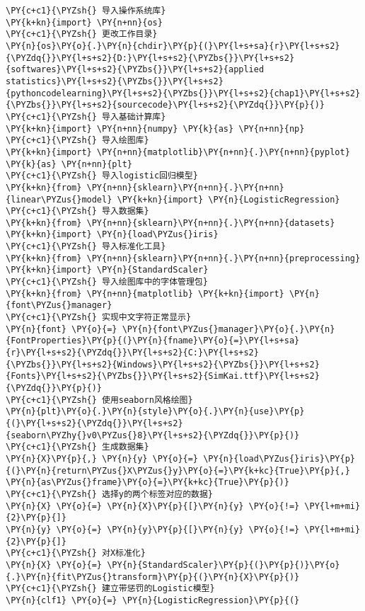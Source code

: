 \begin{Verbatim}[commandchars=\\\{\}]
\PY{c+c1}{\PYZsh{} 导入操作系统库}
\PY{k+kn}{import} \PY{n+nn}{os}
\PY{c+c1}{\PYZsh{} 更改工作目录}
\PY{n}{os}\PY{o}{.}\PY{n}{chdir}\PY{p}{(}\PY{l+s+sa}{r}\PY{l+s+s2}{\PYZdq{}}\PY{l+s+s2}{D:}\PY{l+s+s2}{\PYZbs{}}\PY{l+s+s2}{softwares}\PY{l+s+s2}{\PYZbs{}}\PY{l+s+s2}{applied statistics}\PY{l+s+s2}{\PYZbs{}}\PY{l+s+s2}{pythoncodelearning}\PY{l+s+s2}{\PYZbs{}}\PY{l+s+s2}{chap1}\PY{l+s+s2}{\PYZbs{}}\PY{l+s+s2}{sourcecode}\PY{l+s+s2}{\PYZdq{}}\PY{p}{)}
\PY{c+c1}{\PYZsh{} 导入基础计算库}
\PY{k+kn}{import} \PY{n+nn}{numpy} \PY{k}{as} \PY{n+nn}{np}
\PY{c+c1}{\PYZsh{} 导入绘图库}
\PY{k+kn}{import} \PY{n+nn}{matplotlib}\PY{n+nn}{.}\PY{n+nn}{pyplot} \PY{k}{as} \PY{n+nn}{plt}
\PY{c+c1}{\PYZsh{} 导入logistic回归模型}
\PY{k+kn}{from} \PY{n+nn}{sklearn}\PY{n+nn}{.}\PY{n+nn}{linear\PYZus{}model} \PY{k+kn}{import} \PY{n}{LogisticRegression}
\PY{c+c1}{\PYZsh{} 导入数据集}
\PY{k+kn}{from} \PY{n+nn}{sklearn}\PY{n+nn}{.}\PY{n+nn}{datasets} \PY{k+kn}{import} \PY{n}{load\PYZus{}iris}
\PY{c+c1}{\PYZsh{} 导入标准化工具}
\PY{k+kn}{from} \PY{n+nn}{sklearn}\PY{n+nn}{.}\PY{n+nn}{preprocessing} \PY{k+kn}{import} \PY{n}{StandardScaler}
\PY{c+c1}{\PYZsh{} 导入绘图库中的字体管理包}
\PY{k+kn}{from} \PY{n+nn}{matplotlib} \PY{k+kn}{import} \PY{n}{font\PYZus{}manager}
\PY{c+c1}{\PYZsh{} 实现中文字符正常显示}
\PY{n}{font} \PY{o}{=} \PY{n}{font\PYZus{}manager}\PY{o}{.}\PY{n}{FontProperties}\PY{p}{(}\PY{n}{fname}\PY{o}{=}\PY{l+s+sa}{r}\PY{l+s+s2}{\PYZdq{}}\PY{l+s+s2}{C:}\PY{l+s+s2}{\PYZbs{}}\PY{l+s+s2}{Windows}\PY{l+s+s2}{\PYZbs{}}\PY{l+s+s2}{Fonts}\PY{l+s+s2}{\PYZbs{}}\PY{l+s+s2}{SimKai.ttf}\PY{l+s+s2}{\PYZdq{}}\PY{p}{)}
\PY{c+c1}{\PYZsh{} 使用seaborn风格绘图}
\PY{n}{plt}\PY{o}{.}\PY{n}{style}\PY{o}{.}\PY{n}{use}\PY{p}{(}\PY{l+s+s2}{\PYZdq{}}\PY{l+s+s2}{seaborn\PYZhy{}v0\PYZus{}8}\PY{l+s+s2}{\PYZdq{}}\PY{p}{)}
\PY{c+c1}{\PYZsh{} 生成数据集}
\PY{n}{X}\PY{p}{,} \PY{n}{y} \PY{o}{=} \PY{n}{load\PYZus{}iris}\PY{p}{(}\PY{n}{return\PYZus{}X\PYZus{}y}\PY{o}{=}\PY{k+kc}{True}\PY{p}{,} \PY{n}{as\PYZus{}frame}\PY{o}{=}\PY{k+kc}{True}\PY{p}{)}
\PY{c+c1}{\PYZsh{} 选择y的两个标签对应的数据}
\PY{n}{X} \PY{o}{=} \PY{n}{X}\PY{p}{[}\PY{n}{y} \PY{o}{!=} \PY{l+m+mi}{2}\PY{p}{]}
\PY{n}{y} \PY{o}{=} \PY{n}{y}\PY{p}{[}\PY{n}{y} \PY{o}{!=} \PY{l+m+mi}{2}\PY{p}{]}
\PY{c+c1}{\PYZsh{} 对X标准化}
\PY{n}{X} \PY{o}{=} \PY{n}{StandardScaler}\PY{p}{(}\PY{p}{)}\PY{o}{.}\PY{n}{fit\PYZus{}transform}\PY{p}{(}\PY{n}{X}\PY{p}{)}
\PY{c+c1}{\PYZsh{} 建立带惩罚的Logistic模型}
\PY{n}{clf1} \PY{o}{=} \PY{n}{LogisticRegression}\PY{p}{(}

\end{Verbatim}
